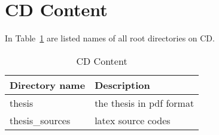 \section{CD Content}

In Table~\ref{tab:obsah} are listed names of all root directories on CD.

\vspace{1cm}
\begin{table}[!htb]
\centering
\begin{tabular}{lp{10cm}}
\textbf{Directory name} & \textbf{Description} \\

\hline
thesis & the thesis in pdf format\\
thesis\_sources & latex source codes \\
\hline
\end{tabular}
\caption{CD Content}
\label{tab:obsah}
\end{table}
